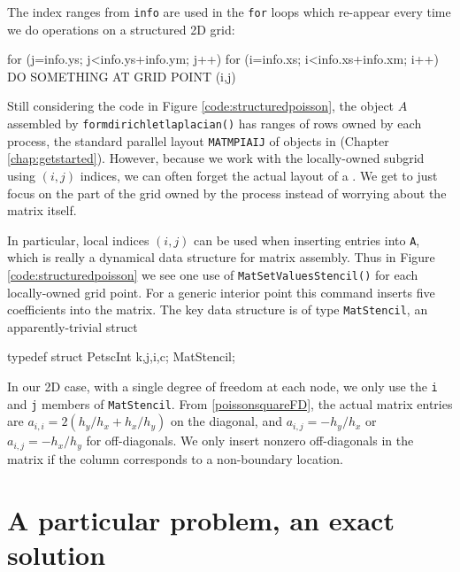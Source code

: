 The index ranges from \texttt{info} are used in the \texttt{for} loops which re-appear every time we do operations on a structured 2D grid:
\begin{code}
for (j=info.ys; j<info.ys+info.ym; j++) {
  for (i=info.xs; i<info.xs+info.xm; i++) {
    DO SOMETHING AT GRID POINT (i,j)
  }
}
\end{code}

Still considering the code in Figure \ref{code:structuredpoisson}, the \pMat object $A$ assembled by \texttt{formdirichletlaplacian()}  has ranges of rows owned by each process, the standard parallel layout \texttt{MATMPIAIJ} of \pMat objects in \PETSc (Chapter \ref{chap:getstarted}).  However, because we work with the locally-owned subgrid using $(i,j)$ indices, we can often forget the actual layout of a \pMat.  We get to just focus on the part of the grid owned by the process instead of worrying about the matrix itself.

In particular, local indices $(i,j)$ can be used when inserting entries into \pMat \texttt{A}, which is really a dynamical data structure for matrix assembly.  Thus in Figure \ref{code:structuredpoisson} we see one use of \texttt{MatSetValuesStencil()} for each locally-owned grid point.  For a generic interior point this command inserts five coefficients into the matrix.  The key data structure is of type \texttt{MatStencil}, an apparently-trivial struct
\begin{code}
typedef struct {
  PetscInt k,j,i,c;
} MatStencil;
\end{code}
In our 2D case, with a single degree of freedom at each node, we only use the \texttt{i} and \texttt{j} members of \texttt{MatStencil}.  From \eqref{poissonsquareFD}, the actual matrix entries are $a_{i,i} = 2\left(h_y/h_x + h_x/h_y\right)$ on the diagonal, and $a_{i,j} = -h_y/h_x$ or $a_{i,j} = -h_x/h_y$ for off-diagonals.  We only insert nonzero off-diagonals in the matrix if the column corresponds to a non-boundary location.


\section{A particular problem, an exact solution}

